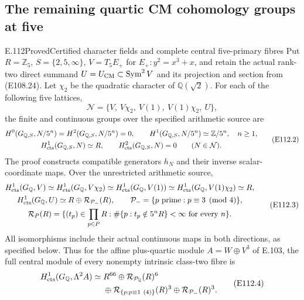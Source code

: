 \subsection*{The remaining quartic CM cohomology groups at five}
\begin{statement}{E.112}{Proved}{Certified character fields and complete central five-primary fibres}
Put $R=\mathbb Z_5$, $S=\{2,5,\infty\}$,
$V=T_5E_+$ for $E_+:y^2=x^3+x$, and retain the actual
rank-two direct summand $U=U_{\rm CM}\subset\operatorname{Sym}^2V$
and its projection and section from (E108.24).
Let $\chi_2$ be the quadratic character of $\mathbb Q(\sqrt2)$.
For each of the following five lattices,
\[
 \mathcal N=\{V,\ V\chi_2,\ V(1),\ V(1)\chi_2,\ U\},
 \tag{E112.1}
\]
the finite and continuous groups over the specified arithmetic source are
\[
 \begin{gathered}
 H^0(G_{\mathbb Q,S},N/5^n)=H^2(G_{\mathbb Q,S},N/5^n)=0,\qquad
 H^1(G_{\mathbb Q,S},N/5^n)\simeq\mathbb Z/5^n,\quad n\ge1,\\
 H^1_{\rm cts}(G_{\mathbb Q,S},N)\simeq R,\qquad
 H^2_{\rm cts}(G_{\mathbb Q,S},N)=0\qquad(N\in\mathcal N).
 \end{gathered}
 \tag{E112.2}
\]
The proof constructs compatible generators $h_N$ and their inverse
scalar-coordinate maps.  Over the unrestricted arithmetic source,
\[
 \begin{gathered}
 H^1_{\rm cts}(G_{\mathbb Q},V)
 \simeq H^1_{\rm cts}(G_{\mathbb Q},V\chi_2)
 \simeq H^1_{\rm cts}(G_{\mathbb Q},V(1))
 \simeq H^1_{\rm cts}(G_{\mathbb Q},V(1)\chi_2)\simeq R,\\
 H^1_{\rm cts}(G_{\mathbb Q},U)
       \simeq R\oplus\mathcal R_{\mathcal P_-}(R),
 \qquad \mathcal P_-=\{p\text{ prime}:p\equiv3\pmod4\},\\
 \mathcal R_P(R)=\{(t_p)\in\prod_{p\in P}R:
       \#\{p:t_p\notin5^nR\}<\infty\text{ for every }n\}.
 \end{gathered}
 \tag{E112.3}
\]
All isomorphisms include their actual continuous maps in both
directions, as specified below.  Thus for the affine plus-quartic
module $A=W\oplus V^3$ of E.103, the full central module of every
nonempty intrinsic class-two fibre is
\[
 \begin{split}
 H^1_{\rm cts}(G_{\mathbb Q},\Lambda^2 A)\simeq{}&R^{66}
   \oplus\mathcal R_{\mathcal P_{\mathbb Q}}(R)^6\\
 &\oplus\mathcal R_{\{p:p\equiv1\ (4)\}}(R)^3
   \oplus\mathcal R_{\mathcal P_-}(R)^3 .
 \end{split}
 \tag{E112.4}
\]

\end{statement}
